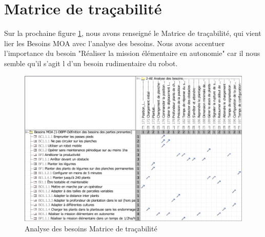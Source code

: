 \section{Matrice de traçabilité}
Sur la prochaine figure \ref{fig:maticeTracabilite}, nous avons renseigné le Matrice de traçabilité, qui vient lier les Besoins MOA avec l'analyse des besoins. Nous avons accentuer l'importance du besoin "Réaliser la mission élémentaire en autonomie" car il nous semble qu'il s'agit l d'un besoin rudimentaire du robot. 
\begin{figure}[!ht]
\centering
\includegraphics[width = \textwidth]{./II/images/Dependency_Matrix__2-AE_Analyse_des_besoins__Matrice_de_tracabilite.pdf}
\caption{Analyse des besoins Matrice de traçabilité}\label{fig:maticeTracabilite}
\end{figure}


